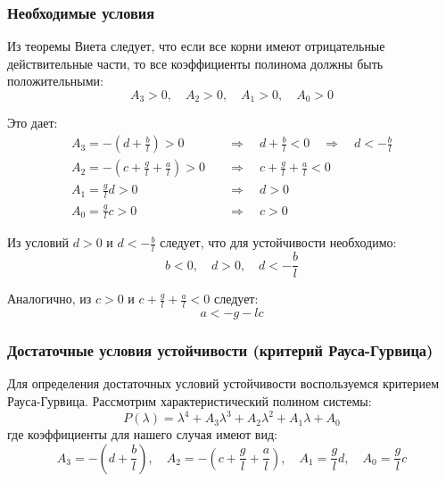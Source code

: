 \documentclass[a4paper, 12pt]{article}
\begin{document}
\subsubsection{Необходимые условия}
Из теоремы Виета следует, что если все корни имеют отрицательные действительные части, то все коэффициенты полинома должны быть положительными:
\begin{equation}
A_3 > 0,\quad A_2 > 0,\quad A_1 > 0,\quad A_0 > 0
\end{equation}

Это дает:
\begin{align}
A_3 = -\left(d + \frac{b}{l}\right) > 0 &\quad\Rightarrow\quad d + \frac{b}{l} < 0 \quad\Rightarrow\quad d < -\frac{b}{l} \\[5pt]
A_2 = -\left(c + \frac{g}{l} + \frac{a}{l}\right) > 0 &\quad\Rightarrow\quad c + \frac{g}{l} + \frac{a}{l} < 0 \\[5pt]
A_1 = \frac{g}{l}d > 0 &\quad\Rightarrow\quad d > 0 \\[5pt]
A_0 = \frac{g}{l}c > 0 &\quad\Rightarrow\quad c > 0
\end{align}

Из условий \(d > 0\) и \(d < -\frac{b}{l}\) следует, что для устойчивости необходимо:
\begin{equation}
b < 0,\quad d > 0,\quad d < -\frac{b}{l}
\end{equation}

Аналогично, из \(c > 0\) и \(c + \frac{g}{l} + \frac{a}{l} < 0\) следует:
\begin{equation}
a < -g - l c
\end{equation}

\subsubsection{Достаточные условия устойчивости (критерий Рауса-Гурвица)}

Для определения достаточных условий устойчивости воспользуемся критерием Рауса-Гурвица. Рассмотрим характеристический полином системы:
\begin{equation}
P(\lambda) = \lambda^4 + A_3\lambda^3 + A_2\lambda^2 + A_1\lambda + A_0
\label{eq:poly}
\end{equation}
где коэффициенты для нашего случая имеют вид:
\begin{equation}
A_3 = -\left(d + \frac{b}{l}\right), \quad 
A_2 = -\left(c + \frac{g}{l} + \frac{a}{l}\right), \quad 
A_1 = \frac{g}{l}d, \quad 
A_0 = \frac{g}{l}c
\label{eq:coeffs}
\end{equation}
\end{document}
